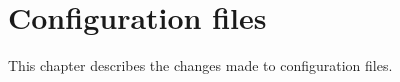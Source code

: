 \chapter{Configuration files}
\label{chp:configfiles}
This chapter describes the changes made to configuration files.


